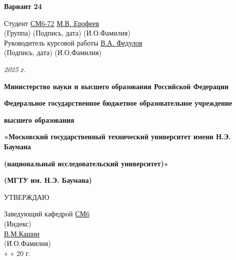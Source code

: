 \documentclass[14pt, a4paper]{report} %
\newcommand{\und}[1]{\uline{#1}}
\begin{document}
\begin{titlepage}
    \vspace{1.5cm}
    \textbf{Вариант 24}

    \vspace{2cm}
    \begin{flushleft}
        Студент \und{СМ6-72} \hfill \underline{\hspace{5cm}} \hfill \und{М.В. Ерофеев} \\
        \hspace{4.8cm} (Группа) \hspace{2.3cm} (Подпись, дата) \hspace{1.8cm} (И.О.Фамилия) \\[1cm]
        Руководитель курсовой работы \hfill \underline{\hspace{5cm}} \hfill \und{В.А. Федулов} \\
        \hspace{7.5cm} (Подпись, дата) \hspace{1.8cm} (И.О.Фамилия)
    \end{flushleft}

    \vfill
    \centering
    \textit{2025 г.}

    \newpage %

    \centering
    \textbf{Министерство науки и высшего образования Российской Федерации}

    \textbf{Федеральное государственное бюджетное образовательное учреждение}

    \textbf{высшего образования}

    \textbf{«Московский государственный технический университет имени Н.Э. Баумана}

    \textbf{(национальный исследовательский университет)»}

    \textbf{(МГТУ им. Н.Э. Баумана)}

    \vspace{1cm}
    УТВЕРЖДАЮ

    \vspace{0.5cm}
    Заведующий кафедрой \und{СМ6} \\
    \hspace{1.5cm} (Индекс) \\[0.5cm]
    \underline{\hspace{5cm}} \und{В.М.Кашин} \\
    \hspace{0.5cm} (И.О.Фамилия) \\[0.5cm]
    « \underline{\hspace{1cm}} » \underline{\hspace{3cm}} 20 \underline{\hspace{1cm}} г.


\end{titlepage}
\end{document}
